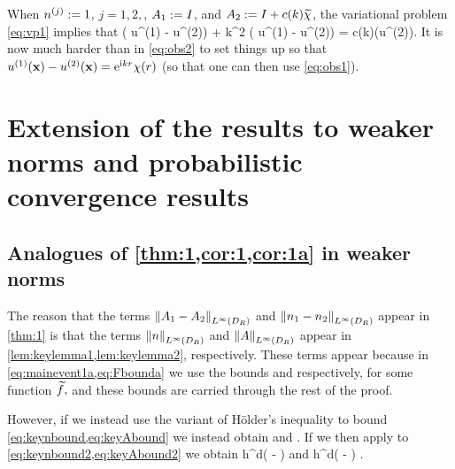When $n^{(j)}:=1$, $j=1,2,$, $A_{1}:=I$, and $A_{2}:= I + c(k)\widetilde{\chi}$, the variational problem \cref{eq:vp1} implies that 
\beqs%
\Delta \big( u^{(1)} - u^{(2)}\big) + k^2 \big( u^{(1)} - u^{(2)}\big) = c(k)\nabla\cdot \big(\widetilde{\chi}\nabla u^{(2)}\big).
\eeqs
It is now much harder than in \cref{eq:obs2} to set things up so that $ u^{(1)}(\mathbf{x}) - u^{(2)}(\mathbf{x})=\mathrm{e}^{\mathrm{i} kr}\chi(r)$ (so that one can then use \cref{eq:obs1}).
\ere


\section{Extension of the results to weaker norms and probabilistic convergence results}
\subsection{Analogues of \cref{thm:1,cor:1,cor:1a} in weaker norms}

The reason that the terms $\NLiDR{\Ao-\At}$ and $\NLiDR{\no-\nt}$ appear in \cref{thm:1} is that the terms $\NLiDR{n}$ and $\NLiDR{A}$ appear in \cref{lem:keylemma1,lem:keylemma2}, respectively. These terms appear because in \cref{eq:mainevent1a,eq:Fbounda} we use the bounds
\beq\label{eq:keynbound}
 \leq {}\NLtDR{\ftilde}
\eeq
and
\beq\label{eq:keyAbound}
 \leq {}\NLtDR{\grad \ftilde}
\eeq
respectively, for some function $\widetilde{f},$ and these bounds are carried through the rest of the proof.

However, if we instead use the variant of H\"older's inequality to bound \cref{eq:keynbound,eq:keyAbound} we instead obtain
\beq\label{eq:keynbound2}
 \leq {}\NLptildeDR{\ftilde}
\eeq
and
\beq\label{eq:keyAbound2}
 \leq {}\NLptildeDR{\ftilde}.
\eeq
If we then apply to \cref{eq:keynbound2,eq:keyAbound2} we obtain
\beq\label{eq:keynboundfinal}
 \leq \Cinvptilde {} h^{d\mleft( - \half\mright)} \NLtDR{\ftilde}
\eeq
and
\beq\label{eq:keyAboundfinal}
 \leq \Cinvptilde {} h^{d\mleft( - \half\mright)} \NLtDR{\grad\ftilde}.
\eeq

